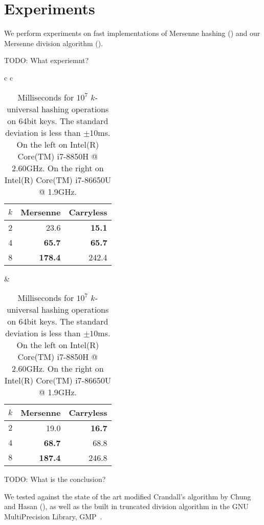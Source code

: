\section{Experiments}\label{sec:experiments}
We perform experiments on fast implementations of Mersenne hashing () and our Mersenne division algorithm ().

TODO: What experiemnt?

\begin{table}[H]
   \centering
   \begin{tabular}{c c}
      \begin{tabular}{r | r r}
         $k$ & Mersenne       & Carryless \\
         \hline
         2 & 23.6 & \textbf{15.1} \\
         4 & \textbf{65.7} & \textbf{65.7} \\
         8 & \textbf{178.4} & 242.4 \\
      \end{tabular}
      \hspace{.5em}
      &
      \hspace{.5em}
      \begin{tabular}{r | r r}
         $k$ & Mersenne       & Carryless \\
         \hline
         $2$ & 19.0           & \textbf{16.7} \\
         $4$ & \textbf{68.7}  & 68.8 \\
         $8$ & \textbf{187.4} & 246.8
      \end{tabular}
   \end{tabular}
   \caption{Milliseconds for $10^7$ $k$-universal hashing operations on 64bit keys.
      The standard deviation is less than $\pm10$ms.
         On the left on Intel(R) Core(TM) i7-8850H @ 2.60GHz.
      On the right on Intel(R) Core(TM) i7-86650U @ 1.9GHz.
   }
   \label{tab:hashing-experiments}
\end{table}

TODO: What is the conclusion?

We tested  against the state of the art modified Crandall's algorithm by Chung and Hasan (), as well as the built in truncated division algorithm in the GNU MultiPrecision Library, GMP~\cite{granlund2010gnu}.

